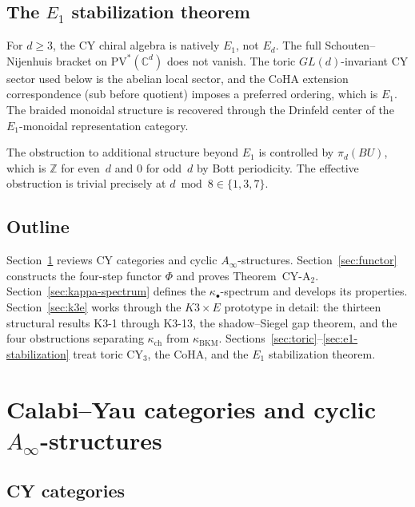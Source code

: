 \documentclass[11pt]{article}
\theoremstyle{plain}
\theoremstyle{definition}
\theoremstyle{remark}
\newcommand{\bC}{\mathbb{C}}
\newcommand{\bZ}{\mathbb{Z}}
\newcommand{\Ainf}{A_\infty}
\newcommand{\Eone}{E_1}
\begin{document}
\subsection{The $\Eone$ stabilization theorem}

For $d \geq 3$, the CY chiral algebra is natively $\Eone$, not
$E_d$.  The full Schouten--Nijenhuis bracket on
$\mathrm{PV}^*(\bC^d)$ does not vanish.  The toric
$GL(d)$-invariant CY sector used below is the abelian local sector,
and the CoHA extension correspondence (sub before quotient) imposes
a preferred ordering, which is $\Eone$.  The braided monoidal structure is
recovered through the Drinfeld center of the $\Eone$-monoidal
representation category.

The obstruction to additional structure beyond $\Eone$ is
controlled by $\pi_d(BU)$, which is $\bZ$ for even~$d$ and
$0$ for odd~$d$ by Bott periodicity.  The effective obstruction is
trivial precisely at $d \bmod 8 \in \{1, 3, 7\}$.

\subsection{Outline}

Section~\ref{sec:cy-cats} reviews CY categories and cyclic
$\Ainf$-structures.  Section~\ref{sec:functor} constructs the
four-step functor $\Phi$ and proves Theorem~CY-A$_2$.
Section~\ref{sec:kappa-spectrum} defines the
$\kappa_\bullet$-spectrum and develops its properties.
Section~\ref{sec:k3e} works through the $K3 \times E$ prototype
in detail: the thirteen structural results K3-1 through K3-13,
the shadow--Siegel gap theorem, and the four obstructions
separating $\kappa_{\mathrm{ch}}$ from $\kappa_{\mathrm{BKM}}$.
Sections~\ref{sec:toric}--\ref{sec:e1-stabilization} treat toric
CY$_3$, the CoHA, and the $\Eone$ stabilization theorem.



\section{Calabi--Yau categories and cyclic $\Ainf$-structures}
\label{sec:cy-cats}

\subsection{CY categories}
\end{document}

